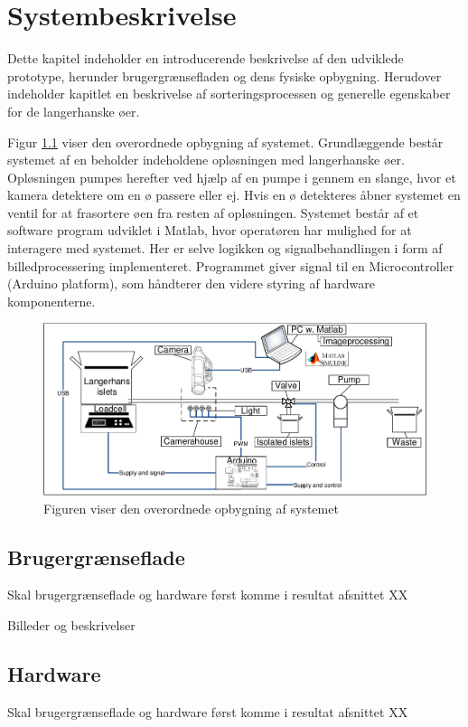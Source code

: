 \chapter{Systembeskrivelse}
Dette kapitel indeholder en introducerende beskrivelse af den udviklede prototype, herunder brugergrænsefladen og dens fysiske opbygning. Herudover indeholder kapitlet en beskrivelse af sorteringsprocessen og generelle egenskaber for de langerhanske øer.

Figur \ref{fig:system} viser den overordnede opbygning af systemet. Grundlæggende består systemet af en beholder indeholdene opløsningen med langerhanske øer. Opløsningen pumpes herefter ved hjælp af en pumpe i gennem en slange, hvor et kamera detektere om en ø passere eller ej. Hvis en ø detekteres åbner systemet en ventil for at frasortere øen fra resten af opløsningen. Systemet består af et software program udviklet i Matlab, hvor operatøren har mulighed for at interagere med systemet. Her er selve logikken og signalbehandlingen i form af billedprocessering implementeret. Programmet giver signal til en Microcontroller (Arduino platform), som håndterer den videre styring af hardware komponenterne.

\begin{figure}[H]
	\centering
	\includegraphics[width=1\textwidth]{billeder/DMTS.pdf}
	\caption{Figuren viser den overordnede opbygning af systemet}
	\label{fig:system}
\end{figure}
%
%


\section{Brugergrænseflade}
Skal brugergrænseflade og hardware først komme i resultat afsnittet XX 

Billeder og beskrivelser

\section{Hardware}
Skal brugergrænseflade og hardware først komme i resultat afsnittet XX 

